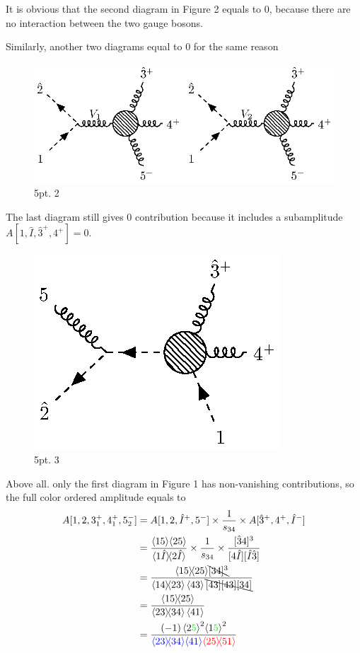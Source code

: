 \documentclass[12pt]{article}
\newcommand{\mdavg}[2]{\langle #1 \rangle\!\langle #2 \rangle}
\newcommand{\avg}[1]{\left\langle #1 \right\rangle}
\newcommand{\doubleavg}[2]{\left\langle #1 \right\rangle\!\left\langle #2 \right\rangle}
\begin{document}
It is obvious that the second diagram in Figure 2 equals to 0, because there are no interaction between the two gauge bosons.
\par
Similarly, another two diagrams equal to 0 for the same reason
\begin{figure}
    \centering
    \includegraphics{5pt2.eps}
    \caption{5pt. 2}
    \label{3}
\end{figure}
\par
The last diagram still gives 0 contribution because it includes a subamplitude $A[1,\hat{I},\hat{3}^+,4^+]=0$.
\par
\begin{figure}[H]
    \centering
    \includegraphics{5pt3.eps}
    \caption{5pt. 3}
    \label{4}
\end{figure}
Above all. only the first diagram in Figure 1 has non-vanishing contributions, so the full color ordered amplitude equals to
\begin{align*}
    A[1,2,3_1^+,4_1^+,5_2^-]&=A[1,2,\hat{I}^+,5^-]\times\frac{1}{s_{34}}\times A[\hat{3}^+,4^+,\hat{I}^-]\\
    &=\frac{\doubleavg{15}{25}}{\mdavg{1\hat{I}}{2\hat{I}}}\times\frac{1}{s_{34}}\times\frac{[\hat{3}4]^3}{[4\hat{I}][\hat{I}\hat{3}]}\\
    &=\frac{\mdavg{15}{25}\bcancel{[34]^3}}{\mdavg{14}{23}\avg{43}\bcancel{[43][43][34]}}\\
    &=\frac{\mdavg{15}{25}}{\mdavg{23}{34}\avg{41}}\\
    &=\frac{(-1)\avg{2\textcolor{green}{5}}^2\!\avg{1\textcolor{green}{5}}^2}{\textcolor{blue}{\mdavg{23}{34}\!\avg{41}}\textcolor{red}{\mdavg{25}{51}}}
\end{align*}
\end{document}
